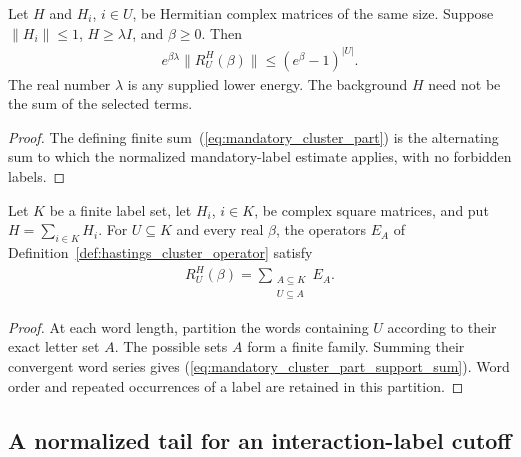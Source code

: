 \begin{lemma}
    \label{thm:mandatory_cluster_part_norm}
    \leanok
    Let $H$ and $H_i$, $i\in U$, be Hermitian complex matrices of the same
    size. Suppose $\|H_i\|\leq1$, $H\geq\lambda I$, and $\beta\geq0$.
    Then
    \begin{align}
        e^{\beta\lambda}\|R_U^H(\beta)\|
        \leq(e^\beta-1)^{|U|}.
        \label{eq:mandatory_cluster_part_norm}
    \end{align}
    The real number $\lambda$ is any supplied lower energy. The background
    $H$ need not be the sum of the selected terms.
\end{lemma}
\begin{proof}\leanok
    The defining finite sum~(\ref{eq:mandatory_cluster_part}) is the
    alternating sum to which the normalized mandatory-label estimate
    applies, with no forbidden labels.
\end{proof}

\begin{lemma}
    \label{thm:mandatory_cluster_part_support_sum}
    \leanok
    Let $K$ be a finite label set, let $H_i$, $i\in K$, be complex square
    matrices, and put $H=\sum_{i\in K}H_i$. For $U\subseteq K$ and every
    real $\beta$, the operators $E_A$ of
    Definition~\ref{def:hastings_cluster_operator} satisfy
    \begin{align}
        R_U^H(\beta)=\sum_{\substack{A\subseteq K \\U\subseteq A}}E_A.
        \label{eq:mandatory_cluster_part_support_sum}
    \end{align}
\end{lemma}
\begin{proof}\leanok
    At each word length, partition the words containing $U$ according to
    their exact letter set $A$. The possible sets $A$ form a finite
    family. Summing their convergent word series gives
    (\ref{eq:mandatory_cluster_part_support_sum}). Word order and repeated
    occurrences of a label are retained in this partition.
\end{proof}


\subsection{A normalized tail for an interaction-label cutoff}

